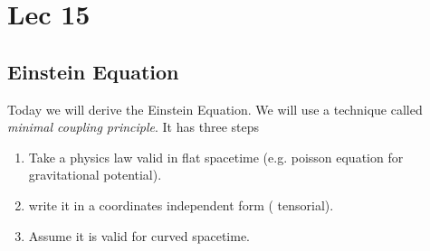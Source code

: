 \section{Lec 15}

\subsection{Einstein Equation}
Today we will derive the Einstein Equation. We will use a technique called \emph{minimal coupling principle}. It has three steps
\begin{enumerate}
\item Take a physics law valid in flat spacetime (e.g. poisson equation for gravitational potential).
\item write it in a coordinates independent form ( tensorial).
\item Assume it is valid for curved spacetime.
\end{enumerate}

